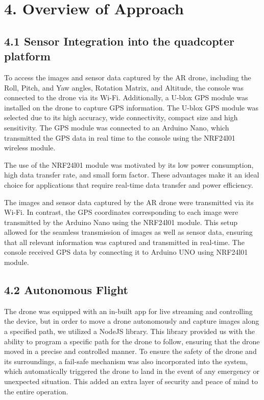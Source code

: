 \documentclass[
  journal=largetwo,
  manuscript=article-type,
  year=2023,
  volume=1,
]{iitp-journal}
\begin{document}

\section{4. Overview of Approach}
\subsection{4.1 Sensor Integration into the quadcopter platform}
To access the images and sensor data captured by the AR drone, including the Roll, Pitch, and Yaw angles, Rotation Matrix, and Altitude, the console was connected to the drone via its Wi-Fi. Additionally, a U-blox GPS module was installed on the drone to capture GPS information. The U-blox GPS module was selected due to its high accuracy, wide connectivity, compact size and high sensitivity. The GPS module was connected to an Arduino Nano, which transmitted the GPS data in real time to the console using the NRF24l01 wireless module.

The use of the NRF24l01 module was motivated by its low power consumption, high data transfer rate, and small form factor. These advantages make it an ideal choice for applications that require real-time data transfer and power efficiency.

The images and sensor data captured by the AR drone were transmitted via its Wi-Fi. In contrast, the GPS coordinates corresponding to each image were transmitted by the Arduino Nano using the NRF24l01 module. This setup allowed for the seamless transmission of images as well as sensor data, ensuring that all relevant information was captured and transmitted in real-time. The console received GPS data by connecting it to Arduino UNO using NRF24l01 module.

\subsection{4.2 Autonomous Flight}
The drone was equipped with an in-built app for live streaming and controlling the device, but in order to move a drone autonomously and capture images along a specified path, we utilized a NodeJS library. This library provided us with the ability to program a specific path for the drone to follow, ensuring that the drone moved in a precise and controlled manner. To ensure the safety of the drone and its surroundings, a fail-safe mechanism was also incorporated into the system, which automatically triggered the drone to land in the event of any emergency or unexpected situation. This added an extra layer of security and peace of mind to the entire operation.
\end{document}
